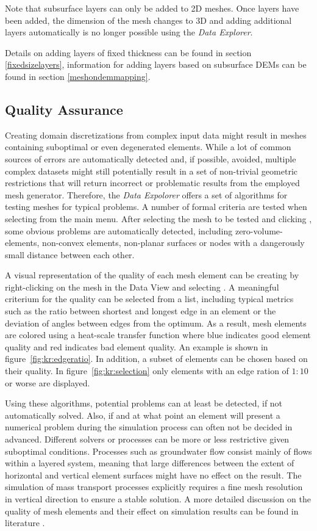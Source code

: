 Note that subsurface layers can only be added to 2D meshes. Once layers have been added, the dimension of the mesh changes to 3D and adding additional layers automatically is no longer possible using the \emph{Data Explorer}.

Details on adding layers of fixed thickness can be found in section \ref{fixedsizelayers}, information for adding layers based on subsurface DEMs can be found in section \ref{meshondemmapping}.

\subsection{Quality Assurance}

Creating domain discretizations from complex input data might result in meshes containing suboptimal or even degenerated elements. While a lot of common sources of errors are automatically detected and, if possible, avoided, multiple complex datasets might still potentially result in a set of non-trivial geometric restrictions that will return incorrect or problematic results from the employed mesh generator. Therefore, the \emph{Data Expolorer} offers a set of algorithms for testing meshes for typical problems. A number of formal criteria are tested when selecting  from the main menu. After selecting the mesh to be tested and clicking , some obvious problems are automatically detected, including zero-volume-elements, non-convex elements, non-planar surfaces or nodes with a dangerously small distance between each other.

A visual representation of the quality of each mesh element can be creating by right-clicking on the mesh in the Data View and selecting . A meaningful criterium for the quality can be selected from a list, including typical metrics such as the ratio between shortest and longest edge in an element or the deviation of angles between edges from the optimum. As a result, mesh elements are colored using a heat-scale transfer function where blue indicates good element quality and red indicates bad element quality. An example is shown in figure~\ref{fig:kr:edgeratio}. In addition, a subset of elements can be chosen based on their quality. In figure~\ref{fig:kr:selection} only elements with an edge ration of $1:10$ or worse are displayed.

Using these algorithms, potential problems can at least be detected, if not automatically solved. Also, if and at what point an element will present a numerical problem during the simulation process can often not be decided in advanced. Different solvers or processes can be more or less restrictive given suboptimal conditions. Processes such as groundwater flow consist mainly of flows within a layered system, meaning that large differences between the extent of horizontal and vertical element surfaces might have no effect on the result. The simulation of mass transport processes explicitly requires a fine mesh resolution in vertical direction to ensure a stable solution. A more detailed discussion on the quality of mesh elements and their effect on simulation results can be found in literature \cite{knupp:quality, shewchuk:quality}.


